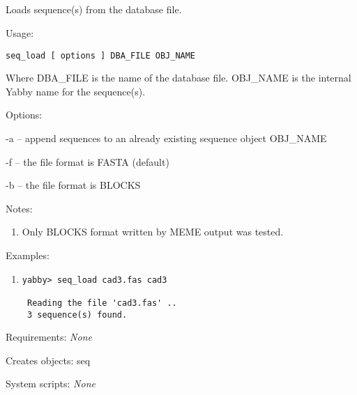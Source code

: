 

\subsection[seq\_load]{  }



Loads sequence(s) from the database file.


\begin{description}


\item{Usage:}

{\tt seq\_load [ options ] DBA\_FILE OBJ\_NAME}

Where DBA\_FILE is the name of the database file. OBJ\_NAME is
the internal Yabby name for the sequence(s).


\item{Options:}
\begin{description}
\item -a -- append sequences to an already existing sequence
object OBJ\_NAME
\item -f -- the file format is FASTA (default)
\item -b -- the file format is BLOCKS
\end{description}


\item{Notes:}
\begin{enumerate}
\item Only BLOCKS format written by MEME \cite{meme} output was tested.
\end{enumerate}


\item{Examples:}
\begin{enumerate}

\item
\begin{verbatim}
yabby> seq_load cad3.fas cad3

 Reading the file 'cad3.fas' ..
 3 sequence(s) found.
\end{verbatim}

\end{enumerate}


\item{Requirements:} {\em None}


\item{Creates objects:} seq


\item{System scripts:} {\em None}

\end{description}

